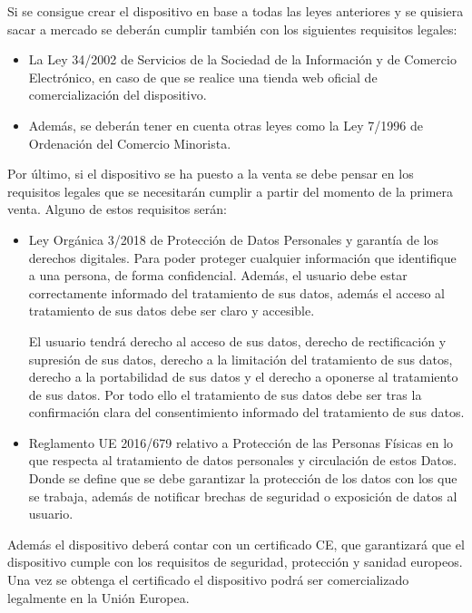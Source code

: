 Si se consigue crear el dispositivo en base a todas las leyes anteriores y se quisiera sacar a mercado se deberán cumplir también con los siguientes requisitos legales:
\begin{itemize}
    \item La Ley 34/2002\cite{comercioElectronico} de Servicios de la Sociedad de la Información y de Comercio Electrónico, en caso de que se realice una tienda web oficial de comercialización del dispositivo.
    
    \item Además, se deberán tener en cuenta otras leyes\cite{comercio} como la Ley 7/1996\cite{comercioMinorista} de Ordenación del Comercio Minorista.
\end{itemize}

Por último, si el dispositivo se ha puesto a la venta se debe pensar en los requisitos legales que se necesitarán cumplir a partir del momento de la primera venta. Alguno de estos requisitos serán:
\begin{itemize}
    \item Ley Orgánica 3/2018\cite{protDatos} de Protección de Datos Personales y garantía de los derechos digitales. Para poder proteger cualquier información que identifique a una persona, de forma confidencial. Además, el usuario debe estar correctamente informado del tratamiento de sus datos, además el acceso al tratamiento de sus datos debe ser claro y accesible.

    El usuario tendrá derecho al acceso de sus datos, derecho de rectificación y supresión de sus datos, derecho a la limitación del tratamiento de sus datos, derecho a la portabilidad de sus datos y el derecho a oponerse al tratamiento de sus datos. Por todo ello el tratamiento de sus datos debe ser tras la confirmación clara del consentimiento informado del tratamiento de sus datos.

    \item Reglamento UE 2016/679\cite{protDatosEU} relativo a Protección de las Personas Físicas en lo que respecta al tratamiento de datos personales y circulación de estos Datos. Donde se define que se debe garantizar la protección de los datos con los que se trabaja, además de notificar brechas de seguridad o exposición de datos al usuario.
\end{itemize}

Además el dispositivo deberá contar con un certificado CE\cite{certificadoEuropeo}, que garantizará que el dispositivo cumple con los requisitos de seguridad, protección y sanidad europeos. Una vez se obtenga el certificado el dispositivo podrá ser comercializado legalmente en la Unión Europea.
